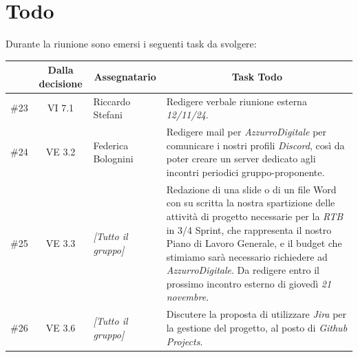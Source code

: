 

\section{Todo}

Durante la riunione sono emersi i seguenti task da svolgere:

\vspace{0.5cm}

\begin{table}[htbp]
\centering
{}
\begin{tabular}{|c|c|p{}|p{}|}
    \hline
    \rowcolor[gray]{0.75}
    \multicolumn{1}{|c|}{\textbf{Codice}} & \multicolumn{1}{|c|}{\textbf{Dalla decisione}} & \multicolumn{1}{|c|}{\textbf{Assegnatario}} & \multicolumn{1}{|c|}{\textbf{Task Todo}} \\
    \hline
    \#23 & VI 7.1 & Riccardo Stefani & Redigere verbale riunione esterna \emph{12/11/24}. \\
    \hline
    \#24 & VE 3.2 & Federica Bolognini & Redigere mail per \emph{AzzurroDigitale} per comunicare i nostri profili \emph{Discord}, così da poter creare un 
    server dedicato agli incontri periodici gruppo-proponente. \\
    \hline
    \#25 & VE 3.3 & \emph{[Tutto il gruppo]} & Redazione di una slide o di un file Word con su scritta la nostra spartizione delle attività di progetto necessarie per 
    la \emph{RTB} in 3/4 Sprint, che rappresenta il nostro Piano di Lavoro Generale, e il budget che stimiamo sarà necessario richiedere ad 
    \emph{AzzurroDigitale}. Da redigere entro il prossimo incontro esterno di giovedì \emph{21 novembre}. \\
    \hline
    \#26 & VE 3.6 & \emph{[Tutto il gruppo]} & Discutere la proposta di utilizzare \emph{Jira} per la gestione del progetto, al posto 
    di \emph{Github Projects}. \\
    \hline
\end{tabular}
\end{table}

